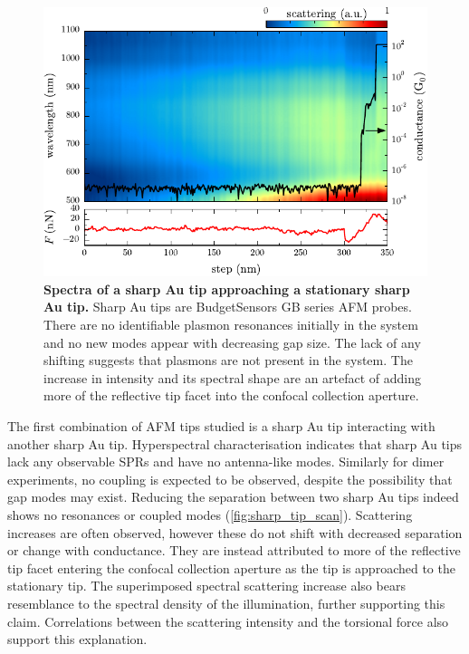 \documentclass[a4paper]{article}
\begin{document}
\begin{figure}[bt]
\centering
\includegraphics{figures/sharp_au_tip_dimer_scan}
\caption[Spectra of a sharp Au tip approaching a stationary sharp Au tip]{\textbf{Spectra of a sharp Au tip approaching a stationary sharp Au tip.} Sharp Au tips are BudgetSensors GB series AFM probes. There are no identifiable plasmon resonances initially in the system and no new modes appear with decreasing gap size. The lack of any shifting suggests that plasmons are not present in the system. The increase in intensity and its spectral shape are an artefact of adding more of the reflective tip facet into the confocal collection aperture.}
\label{fig:sharp_tip_scan}
\end{figure}

The first combination of AFM tips studied is a sharp Au tip interacting with another sharp Au tip. Hyperspectral characterisation indicates that sharp Au tips lack any observable SPRs and have no antenna-like modes. Similarly for dimer experiments, no coupling is expected to be observed, despite the possibility that gap modes may exist. Reducing the separation between two sharp Au tips indeed shows no resonances or coupled modes (\autoref{fig:sharp_tip_scan}). Scattering increases are often observed, however these do not shift with decreased separation or change with conductance. They are instead attributed to more of the reflective tip facet entering the confocal collection aperture as the tip is approached to the stationary tip. The superimposed spectral scattering increase also bears resemblance to the spectral density of the illumination, further supporting this claim. Correlations between the scattering intensity and the torsional force also support this explanation.
\end{document}
